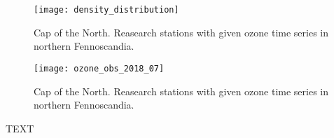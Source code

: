 \documentclass[bg, manuscript]{copernicus}
\begin{document}
\begin{figure}[t]
  \texttt{[image: density\_distribution]}
  \label{fig:density_distribution}
\caption{Cap of the North. Reasearch stations with given ozone time series in northern Fennoscandia.}
\end{figure}

\begin{figure}[t]
  \texttt{[image: ozone\_obs\_2018\_07]}
  \label{fig:ozone_obs_2018_rrea}
\caption{Cap of the North. Reasearch stations with given ozone time series in northern Fennoscandia.}
\end{figure}


\appendixtables   %







\begin{acknowledgements}
TEXT
\end{acknowledgements}














\end{document}
